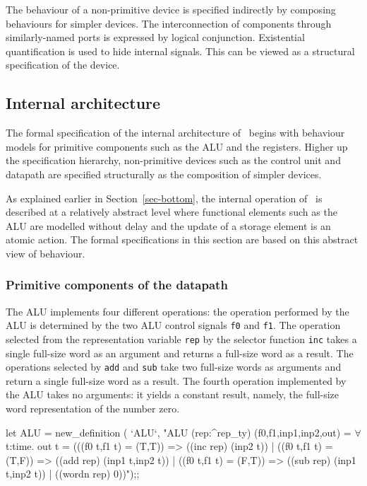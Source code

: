 The behaviour of a non-primitive device is specified indirectly
by composing behaviours for simpler devices.
The interconnection of components
through similarly-named ports
is expressed by logical conjunction.  Existential quantification
is used to hide internal signals.
This can be viewed as a structural specification of the device.

\subsection{Internal architecture}

The formal specification
of the internal architecture
of \Tamarack\ begins with behaviour models for primitive
components such as the ALU and the registers.
Higher up the specification hierarchy, non-primitive devices such
as the control unit and datapath
are specified structurally as the composition of simpler devices.

As explained earlier in Section~\ref{sec-bottom},
the internal operation of
\Tamarack\ is described at a relatively
abstract level where functional elements such as the ALU are modelled
without delay and the update of a storage element is an atomic action.
The formal specifications in this section are based on this abstract view
of behaviour.

\subsubsection{Primitive components of the datapath}

The ALU implements four different operations:
the operation performed by the ALU is determined by the two ALU control
signals \verb"f0" and \verb"f1".
The operation selected
from the representation variable \verb"rep"
by the selector function \verb"inc" takes a single full-size word
as an argument and returns a full-size word as a result.
The operations selected by \verb"add" and \verb"sub"
take two full-size words as arguments and return a single full-size word
as a result.
The fourth operation implemented by the ALU takes no arguments:
it yields a constant result, namely,
the full-size word representation of the number zero.

\begintt
let ALU = new_definition (
  `ALU`,
  "ALU (rep:^rep_ty) (f0,f1,inp1,inp2,out) =
    \(\forall\)t:time.
      out t =
        (((f0 t,f1 t) = (T,T)) => ((inc rep) (inp2 t)) |
         ((f0 t,f1 t) = (T,F)) => ((add rep) (inp1 t,inp2 t)) |
         ((f0 t,f1 t) = (F,T)) => ((sub rep) (inp1 t,inp2 t)) |
                                  ((wordn rep) 0))");;
\endtt


